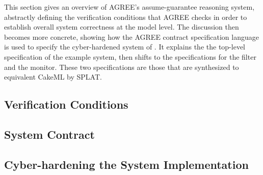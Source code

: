 This section gives an overview of AGREE's assume-guarantee reasoning
system, abstractly defining the verification conditions that AGREE
checks in order to establish overall system correctness at the model
level.  The discussion then becomes more concrete, showing how the
AGREE contract specification language is used to specify the
cyber-hardened system of . It explains the the
top-level specification of the example system, then shifts to the
specifications for the filter and the monitor.  These two
specifications are those that are synthesized to equivalent CakeML by
SPLAT.


\subsection{Verification Conditions}


\subsection{System Contract}


\subsection{Cyber-hardening the System Implementation}

